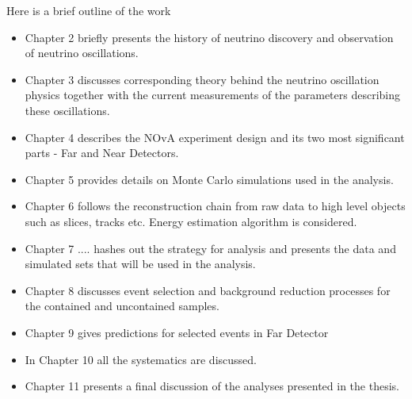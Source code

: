 Here is a brief outline of the work

\begin{itemize}

\item Chapter 2 briefly presents the history of neutrino discovery and observation 
of neutrino oscillations.

\item Chapter 3 discusses corresponding theory behind the neutrino oscillation physics
together with the current measurements of the parameters describing these oscillations.

\item Chapter 4 describes the NOvA experiment design and its two most significant parts -
Far and Near Detectors.

\item Chapter 5 provides details on Monte Carlo simulations used in the analysis.

\item Chapter 6 follows the reconstruction chain from raw data to high level objects 
such as slices, tracks etc. Energy estimation algorithm is considered.

\item Chapter 7 ....  hashes out the strategy for analysis and presents the data and
simulated sets that will be used in the analysis.

\item Chapter 8 discusses event selection and background reduction processes for the 
contained and uncontained samples.

\item Chapter 9 gives predictions for selected events in Far Detector

\item In Chapter 10 all the systematics are discussed.

\item Chapter 11 presents a final discussion of the analyses presented in the
thesis.

\end{itemize}
